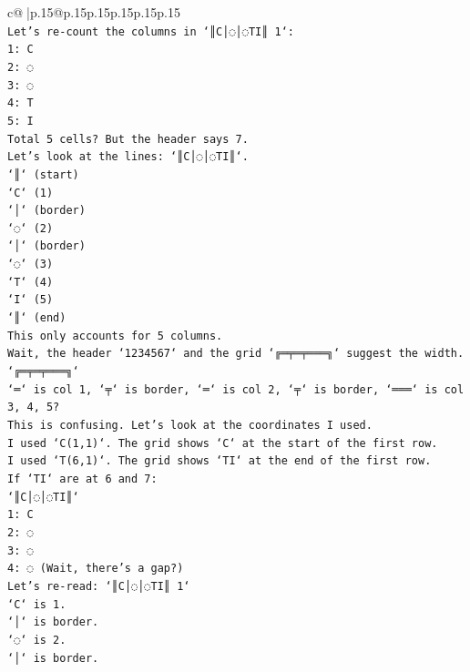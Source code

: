 \documentclass{article}
\begin{document}
{\begin{supertabular}{c@{$\;$}|p{.15\linewidth}@{}p{.15\linewidth}p{.15\linewidth}p{.15\linewidth}p{.15\linewidth}p{.15\linewidth}}
{{{\\ 
\texttt{Let's re{-}count the columns in `║C│◌│◌TI║ 1`:} \\
\texttt{1: C} \\
\texttt{2: ◌} \\
\texttt{3: ◌} \\
\texttt{4: T} \\
\texttt{5: I} \\
\texttt{Total 5 cells? But the header says 7.} \\
\texttt{Let's look at the lines: `║C│◌│◌TI║`.} \\
\texttt{`║` (start)} \\
\texttt{`C` (1)} \\
\texttt{`│` (border)} \\
\texttt{`◌` (2)} \\
\texttt{`│` (border)} \\
\texttt{`◌` (3)} \\
\texttt{`T` (4)} \\
\texttt{`I` (5)} \\
\texttt{`║` (end)} \\
\texttt{This only accounts for 5 columns.} \\
\texttt{Wait, the header `1234567` and the grid `╔═╤═╤═══╗` suggest the width.} \\
\texttt{`╔═╤═╤═══╗`} \\
\texttt{`═` is col 1, `╤` is border, `═` is col 2, `╤` is border, `═══` is col 3, 4, 5?} \\
\texttt{This is confusing. Let's look at the coordinates I used.} \\
\texttt{I used `C(1,1)`. The grid shows `C` at the start of the first row.} \\
\texttt{I used `T(6,1)`. The grid shows `TI` at the end of the first row.} \\
\texttt{If `TI` are at 6 and 7:} \\
\texttt{`║C│◌│◌TI║`} \\
\texttt{1: C} \\
\texttt{2: ◌} \\
\texttt{3: ◌} \\
\texttt{4: ◌ (Wait, there's a gap?)} \\
\texttt{Let's re{-}read: `║C│◌│◌TI║ 1`} \\
\texttt{`C` is 1.} \\
\texttt{`│` is border.} \\
\texttt{`◌` is 2.} \\
\texttt{`│` is border.} \\
}}}
\end{supertabular}}
\end{document}
